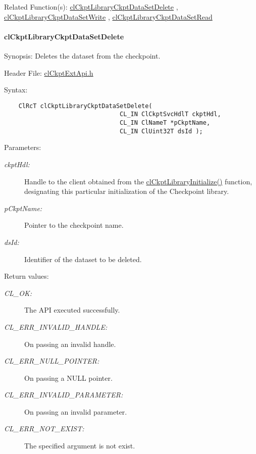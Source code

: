 \begin{Desc}
\item[Related Function(s):]\hyperlink{group__group10}{cl\-Ckpt\-Library\-Ckpt\-Data\-Set\-Delete} , \hyperlink{group__group10}{cl\-Ckpt\-Library\-Ckpt\-Data\-Set\-Write} , \hyperlink{group__group10}{cl\-Ckpt\-Library\-Ckpt\-Data\-Set\-Read} \end{Desc}
\hypertarget{pageckpt206}{}\paragraph{cl\-Ckpt\-Library\-Ckpt\-Data\-Set\-Delete}\label{pageckpt206}
\begin{Desc}
\item[Synopsis:]Deletes the dataset from the checkpoint.\end{Desc}
\begin{Desc}
\item[Header File:]\hyperlink{cl_ckpt_ext_api_8h}{cl\-Ckpt\-Ext\-Api.h}\end{Desc}
\begin{Desc}
\item[Syntax:]

\footnotesize\begin{verbatim}    ClRcT clCkptLibraryCkptDataSetDelete(
                                CL_IN ClCkptSvcHdlT ckptHdl,
                                CL_IN ClNameT *pCkptName,
                                CL_IN ClUint32T dsId );
\end{verbatim}
\normalsize
\end{Desc}
\begin{Desc}
\item[Parameters:]
\begin{description}
\item[{\em ckpt\-Hdl:}]Handle to the client obtained from the \hyperlink{group__group10_ga2}{cl\-Ckpt\-Library\-Initialize()} function, designating this particular initialization of the Checkpoint library. \item[{\em p\-Ckpt\-Name:}]Pointer to the checkpoint name. \item[{\em ds\-Id:}]Identifier of the dataset to be deleted.\end{description}
\end{Desc}
\begin{Desc}
\item[Return values:]
\begin{description}
\item[{\em CL\_\-OK:}]The API executed successfully. \item[{\em CL\_\-ERR\_\-INVALID\_\-HANDLE:}]On passing an invalid handle. \item[{\em CL\_\-ERR\_\-NULL\_\-POINTER:}]On passing a NULL pointer. \item[{\em CL\_\-ERR\_\-INVALID\_\-PARAMETER:}]On passing an invalid parameter. \item[{\em CL\_\-ERR\_\-NOT\_\-EXIST:}]The specified argument is not exist.\end{description}
\end{Desc}
